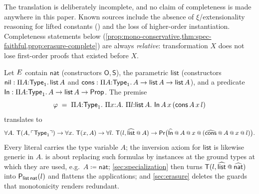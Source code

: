 \begin{remark}[Incompleteness]
\label{rem:incompleteness}
The translation is deliberately incomplete, and no claim of
completeness is made anywhere in this paper.  Known sources include
the absence of $\xi$/extensionality reasoning for lifted constants
(\cite[Example~51]{Czajka2016}) and the loss of higher-order
instantiation.  Completeness statements below
(\cref{prop:mono-conservative,thm:spec-faithful,prop:erasure-complete})
are always \emph{relative}: transformation $X$ does not lose
first-order proofs that existed before $X$.
\end{remark}

\begin{example}
\label{ex:translation}
Let $E$ contain $\mathsf{nat}$ (constructors $\mathsf{O},
\mathsf{S}$), the parametric $\mathsf{list}$ (constructors
$\mathsf{nil} : \Pi A{:}\mathsf{Type}_1.\,\mathsf{list}\,A$ and
$\mathsf{cons} : \Pi A{:}\mathsf{Type}_1.\,A \to \mathsf{list}\,A \to
\mathsf{list}\,A$), and a predicate $\mathsf{In} : \Pi
A{:}\mathsf{Type}_1.\,A \to \mathsf{list}\,A \to \mathsf{Prop}$.  The premise
\[
  \varphi \;=\; \Pi A{:}\STypeI.\ \Pi x{:}A.\ \Pi
  l{:}\mathsf{list}\,A.\ \mathsf{In}\,A\,x\,(\mathsf{cons}\,A\,x\,l)
\]
translates to
\[
  \forall A.\ \hastype(A, \lift{\STypeI}) \to
  \forall x.\ \hastype(x, A) \to
  \forall l.\ \hastype(l, \widehat{\mathsf{list}} \app A) \to
  \PR\bigl(\widehat{\mathsf{In}} \app A \app x \app
     (\widehat{\mathsf{cons}} \app A \app x \app l)\bigr).
\]
Every literal carries the type variable $A$; the inversion axiom for
$\mathsf{list}$ is likewise generic in $A$.   is
about replacing such formulas by instances at the ground types at
which they are used, e.g.\ $A \coloneqq \mathsf{nat}$;
\cref{sec:specialization} then turns $\hastype(l,
\widehat{\mathsf{list}} \app \widehat{\mathsf{nat}})$ into
$\mathsf{P}_{\mathsf{list\,nat}}(l)$ and flattens the applications; and
\cref{sec:erasure} deletes the guards that monotonicity renders
redundant.
\end{example}
